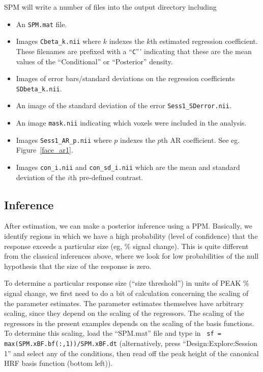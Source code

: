 SPM will write a number of files into the output directory including 
\begin{itemize}
\item An \texttt{SPM.mat} file.
\item Images \texttt{Cbeta\_k.nii} where $k$ indexes the $k$th estimated regression coefficient. These filenames are prefixed with a ``\texttt{C}''' indicating that these are the mean values of the ``Conditional'' or ``Posterior'' density.
\item Images of error bars/standard deviations on the regression coefficients \texttt{SDbeta\_k.nii}.
\item An image of the standard deviation of the error \texttt{Sess1\_SDerror.nii}.
\item An image \texttt{mask.nii} indicating which voxels  were included in the analysis.
\item Images \texttt{Sess1\_AR\_p.nii} where $p$ indexes the $p$th AR coefficient. See eg. Figure~\ref{face_ar1}.
\item Images \texttt{con\_i.nii} and \texttt{con\_sd\_i.nii} which are the mean and standard deviation of the $i$th pre-defined contrast.
\end{itemize}

\subsection{Inference}

After estimation, we can make a posterior inference using a PPM. Basically, we identify regions in which we have a high probability (level of confidence) that the response exceeds a particular size (eg, \% signal change). This is quite different from the classical inferences above, where we look for low probabilities of the null hypothesis that the size of the response is zero.

To determine a particular response size (``size threshold'') in units of PEAK \% signal change, we first need to do a bit of calculation concerning the scaling of the parameter estimates. The parameter estimates themselves have arbitrary scaling, since they depend on the scaling of the regressors. The scaling of the regressors in the present examples depends on the scaling of the basis functions. To determine this scaling, load the ``SPM.mat'' file and type in \matlab\ \texttt{sf = max(SPM.xBF.bf(:,1))/SPM.xBF.dt} (alternatively, press ``Design:Explore:Session 1'' and select any of the conditions, then read off the peak height of the canonical HRF basis function (bottom left)).

